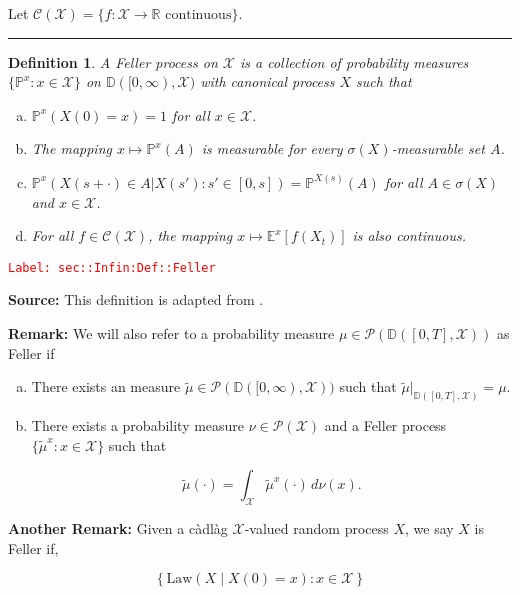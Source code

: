 \documentclass[12pt]{article}
\newcommand{\mb}{\mathbb}
\newcommand{\mc}{\mathcal}
\newcommand{\ra}{\rightarrow}
\newcommand{\te}{\text}
\newcommand{\tr}{\textcolor{red}}
\newcommand{\labe}[1]{\tr{\texttt{Label: #1}}}
\newcommand{\lin}{\rule{\linewidth}{0.4 pt}}
\newcommand{\pr}{\mb{P}}							%
\newcommand{\exmu}[2]{\mb{E}^{#1}\left[#2\right]}	%
\newcommand{\cad}{\mb{D}}							%
\newcommand{\T}{T}								%
\newcommand{\x}{x}								%
\renewcommand{\t}{t}							%
\renewcommand{\tt}{s}							%
\newcommand{\ttt}{s'}							%
\newcommand{\X}{X}								%
\newcommand{\f}{f}								%
\newcommand{\tp}[1]{(#1)}						%
\newcommand{\cont}{\mc{C}}						%
\newcommand{\alt}[1]{\widetilde{#1}}			%
\newcommand{\m}{\mu}							%
\newcommand{\mm}{\nu}							%
\newcommand{\law}{\te{Law}}						%
\newcommand{\me}[1]{^{#1}}						%
\newcommand{\typset}{A}							%
\newcommand{\spce}{\mc{X}}						%
\newtheorem{defn}[thms]{Definition}
\begin{document}
Let \(\cont(\spce)= \{f:\spce \ra \mb{R} \te{ continuous}\}\).

\lin

\begin{defn}
A Feller process on \(\spce\) is a collection of probability measures \(\{\pr\me{\x}:\x \in \spce\}\) on \(\cad([0,\infty),\spce)\) with canonical process \(\X\) such that

\begin{enumerate}[(a)]
\item \(\pr\me{\x}(\X\tp{0} = \x) = 1\) for all \(\x \in \spce\).

\item The mapping \(\x \mapsto \pr\me{\x}(\typset)\) is measurable for every \(\sigma(\X)\)-measurable set \(\typset\).

\item \(\pr\me{\x}(\X\tp{\tt+\cdot} \in \typset|\X\tp{\ttt}:\ttt \in [0,\tt]) = \pr\me{\X\tp{\tt}}(\typset)\) for all \(\typset \in \sigma(\X)\) and \(\x \in \spce\).

\item For all \(\f\in \cont(\spce)\), the mapping \(\x\mapsto \exmu{\x}{\f(\X_{\t})}\) is also continuous.
\end{enumerate}
\label{sec::Infin:Def::Feller}
\end{defn}
\labe{sec::Infin:Def::Feller}

\textbf{Source: } This definition is adapted from \cite[Definition 1.1,1.2]{Lig85}.

\textbf{Remark: } We will also refer to a probability measure \(\m \in \mc{P}(\cad([0,\T],\spce))\) as Feller if

\begin{enumerate}[(a)]
\item There exists an measure \(\alt{\m}\in \mc{P}(\cad([0,\infty),\spce))\) such that \(\alt{\m}|_{\cad([0,T],\spce)} = \m\).

\item There exists a probability measure \(\mm\in \mc{P}(\spce)\) and a Feller process \(\{\alt{\m}^\x:\x \in \spce\}\) such that 

\[\alt{\m}(\cdot) = \int_{\spce} \alt{\m}^\x(\cdot)\,d\mm(\x).\]
\end{enumerate}

\textbf{Another Remark: } Given a c\`adl\`ag \(\spce\)-valued random process \(\X\), we say \(\X\) is Feller if,

\[\left\{\law\left(\X\middle|\X\tp{0} = \x\right): \x \in \spce\right\}\]
\end{document}
